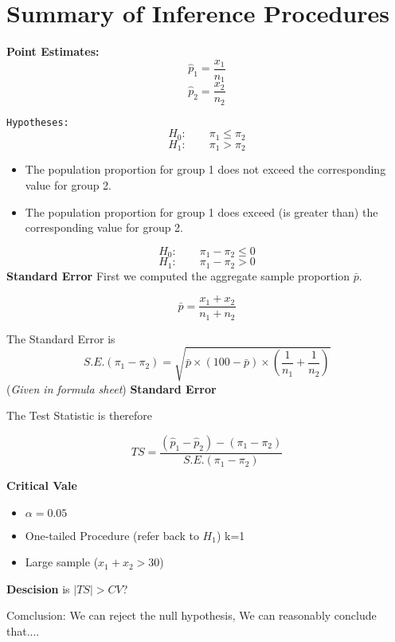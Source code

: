 \documentclass[]{report}
\begin{document}
\newpage



\section{Summary of Inference Procedures}
\textbf{Point Estimates:}
\[\hat{p}_1 = \frac{x_1}{n_1}  \]
\[\hat{p}_2 = \frac{x_2}{n_2}  \]

\texttt{Hypotheses:}
\[H_0 : \qquad \pi_1 \leq \pi_2   \]
\[H_1 : \qquad \pi_1 > \pi_2   \]

\begin{itemize}
\item The population proportion for group 1 does not exceed the corresponding value for group 2. 
\item The population proportion for group 1 does exceed (is greater than) the corresponding value for group 2.
\end{itemize}

\[H_0 : \qquad \pi_1 - \pi_2  \leq 0  \]
\[H_1 : \qquad \pi_1 - \pi_2 > 0   \]
\textbf{Standard Error}
First we computed the aggregate sample proportion $\bar{p}$.

\[\bar{p} = \frac{x_1 + x_2}{n_1 + n_2}\]

The Standard Error is 
\[ S.E.(\pi_1 - \pi_2) = \sqrt{\bar{p} \times (100-\bar{p}) \times \left(\frac{1}{n_1}+ \frac{1}{n_2} \right)}\]
(\textit{Given in formula sheet})
\textbf{Standard Error}

The Test Statistic is therefore 

\[ TS = \frac{(\hat{p}_1-\hat{p}_2)-(\pi_1 - \pi_2)}{S.E.(\pi_1 - \pi_2)}\]


\textbf{Critical Vale}
\begin{itemize}
\item $\alpha = 0.05$
\item One-tailed Procedure (refer back to $H_1$) k=1
\item Large sample ($x_1+x_2 > 30$)
\end{itemize}

\textbf{Descision}
is $|TS| > CV$?

Comclusion: We can reject the null hypothesis, We can reasonably conclude that....
\end{document}
